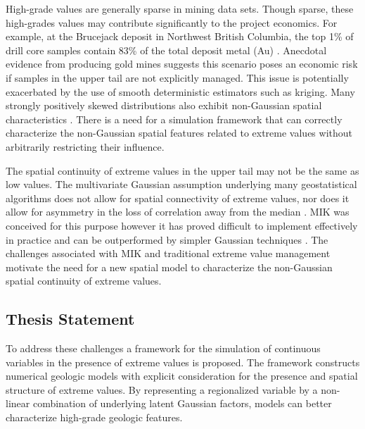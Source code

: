 High-grade values are generally sparse in mining data sets. Though sparse, these high-grades values may contribute significantly to the project economics. For example, at the Brucejack deposit in Northwest British Columbia, the top 1\% of drill core samples contain 83\% of the total deposit metal (Au) \citep{pretium2020}. Anecdotal evidence from producing gold mines suggests this scenario poses an economic risk if samples in the upper tail are not explicitly managed. This issue is potentially exacerbated by the use of smooth deterministic estimators such as kriging. Many strongly positively skewed distributions also exhibit non-Gaussian spatial characteristics \citep{journel1989nongaussian}. There is a need for a simulation framework that can correctly characterize the non-Gaussian spatial features related to extreme values without arbitrarily restricting their influence.

The spatial continuity of extreme values in the upper tail may not be the same as low values. The multivariate Gaussian assumption underlying many geostatistical algorithms does not allow for spatial connectivity of extreme values, nor does it allow for asymmetry in the loss of correlation away from the median \citep{journel1989nongaussian}. \Gls{MIK} \citep{journel1983nonparametric} was conceived for this purpose however it has proved difficult to implement effectively in practice and can be outperformed by simpler Gaussian techniques \citep{vincent2021mik}. The challenges associated with \gls{MIK} and traditional extreme value management motivate the need for a new spatial model to characterize the non-Gaussian spatial continuity of extreme values.

\FloatBarrier
\subsection{Thesis Statement}
\label{subsec:01thesis}

To address these challenges a framework for the simulation of continuous variables in the presence of extreme values is proposed. The framework constructs numerical geologic models with explicit consideration for the presence and spatial structure of extreme values. By representing a regionalized variable by a non-linear combination of underlying latent Gaussian factors, models can better characterize high-grade geologic features.

